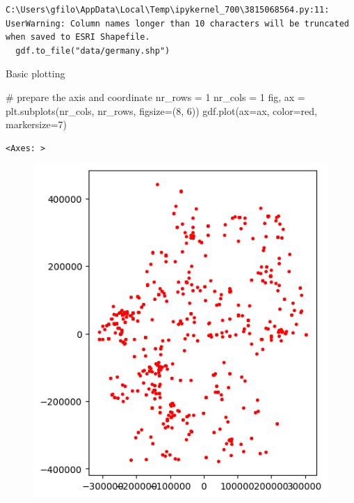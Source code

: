 \documentclass[
  letterpaper,
  DIV=11,
  numbers=noendperiod]{scrreprt}
\newenvironment{Shaded}{\begin{snugshade}}{\end{snugshade}}
\newcommand{\CommentTok}[1]{\textcolor[rgb]{0.37,0.37,0.37}{#1}}
\newcommand{\DecValTok}[1]{\textcolor[rgb]{0.68,0.00,0.00}{#1}}
\newcommand{\NormalTok}[1]{\textcolor[rgb]{0.00,0.23,0.31}{#1}}
\newcommand{\OperatorTok}[1]{\textcolor[rgb]{0.37,0.37,0.37}{#1}}
\newcommand{\StringTok}[1]{\textcolor[rgb]{0.13,0.47,0.30}{#1}}
\begin{document}
\begin{verbatim}
C:\Users\gfilo\AppData\Local\Temp\ipykernel_700\3815068564.py:11: UserWarning: Column names longer than 10 characters will be truncated when saved to ESRI Shapefile.
  gdf.to_file("data/germany.shp")
\end{verbatim}

Basic plotting

\begin{Shaded}
\begin{Highlighting}[]
\CommentTok{\# prepare the axis and coordinate}
\NormalTok{nr\_rows }\OperatorTok{=} \DecValTok{1}
\NormalTok{nr\_cols }\OperatorTok{=} \DecValTok{1}
\NormalTok{fig, ax }\OperatorTok{=}\NormalTok{ plt.subplots(nr\_cols, nr\_rows, figsize}\OperatorTok{=}\NormalTok{(}\DecValTok{8}\NormalTok{, }\DecValTok{6}\NormalTok{))}
\NormalTok{gdf.plot(ax}\OperatorTok{=}\NormalTok{ax, color}\OperatorTok{=}\StringTok{\textquotesingle{}red\textquotesingle{}}\NormalTok{, markersize}\OperatorTok{=}\DecValTok{7}\NormalTok{)}
\end{Highlighting}
\end{Shaded}

\begin{verbatim}
<Axes: >
\end{verbatim}

\begin{figure}[H]

{\centering \includegraphics{labs/w02_maps_files/figure-pdf/cell-5-output-2.png}

}

\end{figure}
\end{document}
